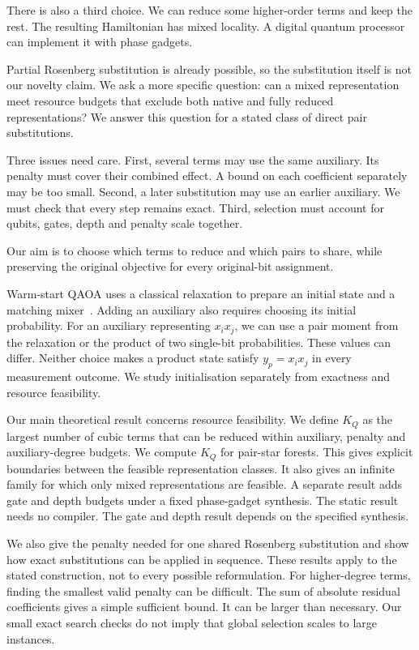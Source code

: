 \documentclass[a4paper,onecolumn,11pt,unpublished]{quantumarticle}
\theoremstyle{remark}
\begin{document}
There is also a third choice. We can reduce some higher-order terms and keep
the rest. The resulting Hamiltonian has mixed locality. A digital quantum
processor can implement it with phase gadgets.

Partial Rosenberg substitution is already possible, so the substitution
itself is not our novelty claim. We ask a more specific question: can a
mixed representation meet resource budgets that exclude both native and
fully reduced representations? We answer this question for a stated class
of direct pair substitutions.

Three issues need care. First, several terms may use the same auxiliary.
Its penalty must cover their combined effect. A bound on each coefficient
separately may be too small. Second, a later substitution may use an earlier
auxiliary. We must check that every step remains exact. Third, selection
must account for qubits, gates, depth and penalty scale together.

Our aim is to choose which terms to reduce and which pairs to share, while
preserving the original objective for every original-bit assignment.

Warm-start QAOA uses a classical relaxation to prepare an initial state and
a matching mixer~\cite{Egger2021,TateSDP2023,TateCustom2023}.
Adding an auxiliary also requires choosing its initial probability.
For an auxiliary representing $x_i x_j$, we can use a pair moment from the
relaxation or the product of two single-bit probabilities. These values can
differ. Neither choice makes a product state satisfy $y_p=x_i x_j$ in every
measurement outcome. We study initialisation separately from exactness and
resource feasibility.

Our main theoretical result concerns resource feasibility. We define $K_Q$
as the largest number of cubic terms that can be reduced within auxiliary,
penalty and auxiliary-degree budgets. We compute $K_Q$ for pair-star forests.
This gives explicit boundaries between the feasible representation classes.
It also gives an infinite family for which only mixed representations are
feasible. A separate result adds gate and depth budgets under a fixed
phase-gadget synthesis. The static result needs no compiler. The gate and
depth result depends on the specified synthesis.

We also give the penalty needed for one shared Rosenberg substitution and
show how exact substitutions can be applied in sequence. These results
apply to the stated construction, not to every possible reformulation.
For higher-degree terms, finding the smallest valid penalty can be difficult.
The sum of absolute residual coefficients gives a simple sufficient bound.
It can be larger than necessary. Our small exact search checks do not imply
that global selection scales to large instances.
\end{document}
